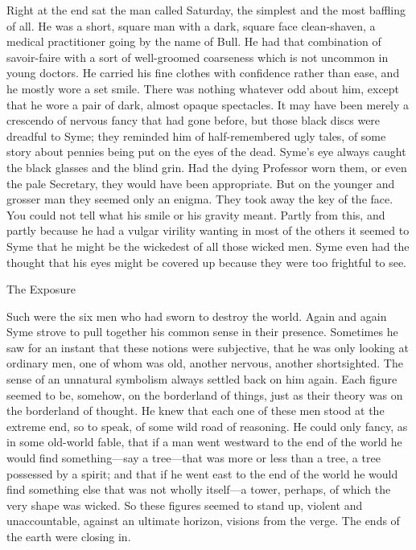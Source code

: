 Right at the end sat the man called Saturday, the simplest and the most baffling of all. He was a short, square man with a dark, square face clean-shaven, a medical practitioner going by the name of Bull. He had that combination of savoir-faire with a sort of well-groomed coarseness which is not uncommon in young doctors. He carried his fine clothes with confidence rather than ease, and he mostly wore a set smile. There was nothing whatever odd about him, except that he wore a pair of dark, almost opaque spectacles. It may have been merely a crescendo of nervous fancy that had gone before, but those black discs were dreadful to Syme; they reminded him of half-remembered ugly tales, of some story about pennies being put on the eyes of the dead. Syme’s eye always caught the black glasses and the blind grin. Had the dying Professor worn them, or even the pale Secretary, they would have been appropriate. But on the younger and grosser man they seemed only an enigma. They took away the key of the face. You could not tell what his smile or his gravity meant. Partly from this, and partly because he had a vulgar virility wanting in most of the others it seemed to Syme that he might be the wickedest of all those wicked men. Syme even had the thought that his eyes might be covered up because they were too frightful to see.

\chap The Exposure

Such were the six men who had sworn to destroy the world. Again and again Syme strove to pull together his common sense in their presence. Sometimes he saw for an instant that these notions were subjective, that he was only looking at ordinary men, one of whom was old, another nervous, another shortsighted. The sense of an unnatural symbolism always settled back on him again. Each figure seemed to be, somehow, on the borderland of things, just as their theory was on the borderland of thought. He knew that each one of these men stood at the extreme end, so to speak, of some wild road of reasoning. He could only fancy, as in some old-world fable, that if a man went westward to the end of the world he would find something⁠—say a tree⁠—that was more or less than a tree, a tree possessed by a spirit; and that if he went east to the end of the world he would find something else that was not wholly itself⁠—a tower, perhaps, of which the very shape was wicked. So these figures seemed to stand up, violent and unaccountable, against an ultimate horizon, visions from the verge. The ends of the earth were closing in.

